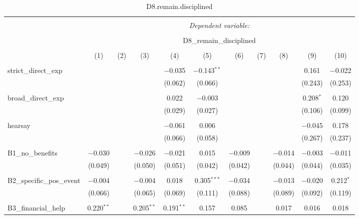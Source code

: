 
\begin{table}[H] \centering 
  \caption{D8.remain.disciplined} 
  \label{} 
\tiny 
\begin{tabular}{@{\extracolsep{4pt}}lcccccccccc} 
\\[-1.8ex]\hline 
\hline \\[-1.8ex] 
 & \multicolumn{10}{c}{\textit{Dependent variable:}} \\ 
\cline{2-11} 
\\[-1.8ex] & \multicolumn{10}{c}{D8\_remain\_disciplined} \\ 
\\[-1.8ex] & (1) & (2) & (3) & (4) & (5) & (6) & (7) & (8) & (9) & (10)\\ 
\hline \\[-1.8ex] 
 strict\_direct\_exp &  &  &  & $-$0.035 & $-$0.143$^{**}$ &  &  &  & 0.161 & $-$0.022 \\ 
  &  &  &  & (0.062) & (0.066) &  &  &  & (0.243) & (0.253) \\ 
  & & & & & & & & & & \\ 
 broad\_direct\_exp &  &  &  & 0.022 & $-$0.003 &  &  &  & 0.208$^{*}$ & 0.120 \\ 
  &  &  &  & (0.029) & (0.027) &  &  &  & (0.106) & (0.099) \\ 
  & & & & & & & & & & \\ 
 hearsay &  &  &  & $-$0.061 & 0.006 &  &  &  & $-$0.045 & 0.178 \\ 
  &  &  &  & (0.066) & (0.058) &  &  &  & (0.267) & (0.237) \\ 
  & & & & & & & & & & \\ 
 B1\_no\_benefits & $-$0.030 &  & $-$0.026 & $-$0.021 & 0.015 & $-$0.009 &  & $-$0.014 & $-$0.003 & $-$0.011 \\ 
  & (0.049) &  & (0.050) & (0.051) & (0.042) & (0.042) &  & (0.044) & (0.044) & (0.035) \\ 
  & & & & & & & & & & \\ 
 B2\_specific\_pos\_event & $-$0.004 &  & $-$0.004 & 0.018 & 0.305$^{***}$ & $-$0.034 &  & $-$0.013 & $-$0.020 & 0.212$^{*}$ \\ 
  & (0.066) &  & (0.065) & (0.069) & (0.111) & (0.088) &  & (0.089) & (0.092) & (0.119) \\ 
  & & & & & & & & & & \\ 
 B3\_financial\_help & 0.220$^{**}$ &  & 0.205$^{**}$ & 0.191$^{**}$ & 0.157 & 0.085 &  & 0.017 & 0.016 & 0.018 \\ 

\end{tabular}
\end{table}
